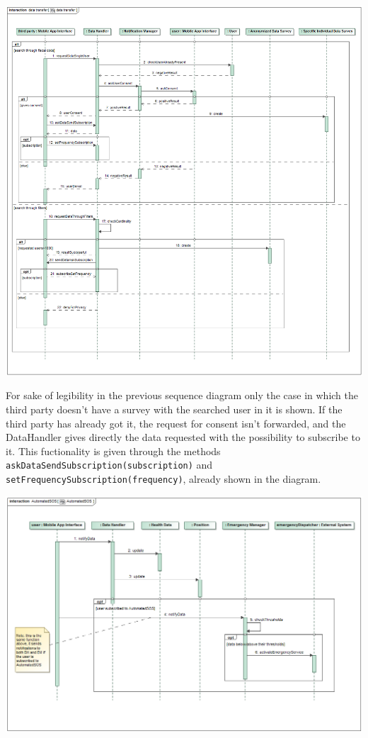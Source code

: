 \begin{center}
\includegraphics[scale=0.4]{sections/diagrams/data_transfer}
\newline
{}
\end{center}

For sake of legibility in the previous sequence diagram only the case in which the third party doesn't have a survey with the searched user in it is shown. If the third party has already got it, the request for consent isn't forwarded, and the DataHandler gives directly the data requested with the possibility to subscribe to it. This fuctionality is given through the methods \texttt{askDataSendSubscription(subscription)} and \texttt{setFrequencySubscription(frequency)}, already shown in the diagram.

\begin{center}
\includegraphics[scale=0.4]{sections/diagrams/AutomatedSOS}
\newline
{}
\end{center} 


